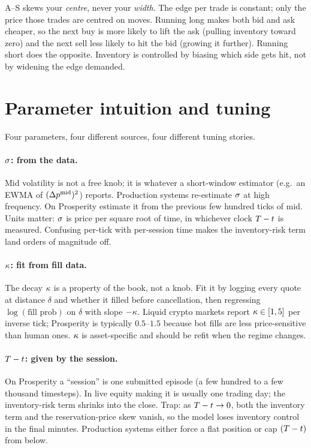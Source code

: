 \begin{intuitionbox}
A--S skews your \emph{centre}, never your \emph{width}. The edge per
trade is constant; only the price those trades are centred on moves.
Running long makes both bid and ask cheaper, so the next buy is more
likely to lift the ask (pulling inventory toward zero) and the next
sell less likely to hit the bid (growing it further). Running short
does the opposite. Inventory is controlled by biasing which side
gets hit, not by widening the edge demanded.
\end{intuitionbox}

\section{Parameter intuition and tuning}
\label{sec:ch8_params}

Four parameters, four different sources, four different tuning
stories.

\paragraph{$\sigma$: from the data.} Mid volatility is not a
free knob; it is whatever a short-window estimator (e.g.\ an EWMA of
$(\Delta p^{\mathrm{mid}})^2$) reports. Production systems re-estimate $\sigma$
at high frequency. On Prosperity estimate it from the previous few
hundred ticks of mid. Units matter: $\sigma$ is price per square
root of time, in whichever clock $T - t$ is measured. Confusing
per-tick with per-session time makes the inventory-risk term land
orders of magnitude off.

\paragraph{$\kappa$: fit from fill data.} The decay $\kappa$
is a property of the book, not a knob. Fit it by logging every quote
at distance $\delta$ and whether it filled before cancellation, then
regressing $\log(\text{fill prob})$ on $\delta$ with slope
$-\kappa$. Liquid crypto markets report $\kappa \in [1, 5]$ per
inverse tick; Prosperity is typically $0.5$--$1.5$ because bot fills
are less price-sensitive than human ones. $\kappa$ is
asset-specific and should be refit when the regime changes.

\paragraph{$T - t$: given by the session.} On Prosperity a
``session'' is one submitted episode (a few hundred to a few
thousand timesteps). In live equity making it is usually one trading
day; the inventory-risk term shrinks into the close. Trap: as
$T - t \to 0$, both the inventory term and the reservation-price
skew vanish, so the model loses inventory control in the final
minutes. Production systems either force a flat position or cap
$(T - t)$ from below.

